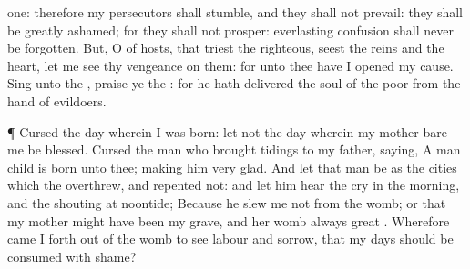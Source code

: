 {one: therefore my
persecutors shall
stumble, and they shall not
prevail: they shall be
greatly
ashamed; for they shall not
prosper:
{}
everlasting
confusion shall never be
forgotten.
But, O
{} of
hosts, that
triest the
righteous,
{}
seest the
reins and the
heart, let me
see thy
vengeance on them: for unto thee have I
opened my
cause.
Sing unto the
{},
praise ye the
{}: for he hath
delivered the
soul of the
poor from the
hand of
evildoers.
\par }{\PP {}¶
Cursed
{} the
day wherein I was
born: let not the
day wherein my
mother
bare me be
blessed.
Cursed
{} the
man who brought
tidings to my
father,
saying, A
man
child is
born unto thee; making him
very
glad.
And let that
man be as the
cities which the
{}
overthrew, and
repented not: and let him
hear the
cry in the
morning, and the
shouting at
noontide;
Because he
slew me not from the
womb; or that my
mother might have been my
grave, and her
womb
{}
always
great
{}.
Wherefore came I
forth out of the
womb to
see
labour and
sorrow, that my
days should be
consumed with
shame?

}
